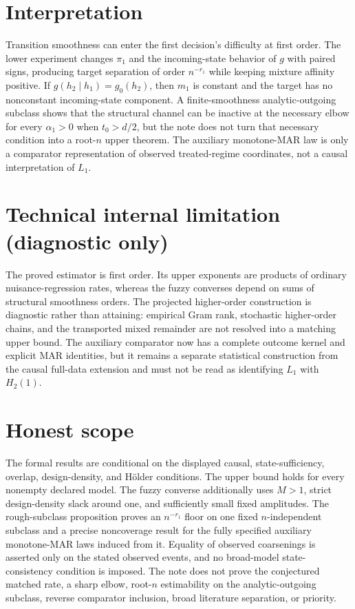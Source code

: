 \documentclass{article}
\begin{document}
\section{Interpretation}

Transition smoothness can enter the first decision's difficulty at first order. The lower experiment changes \(\pi_1\) and the incoming-state behavior of \(g\) with paired signs, producing target separation of order \(n^{-r_1}\) while keeping mixture affinity positive. If \(g(h_2\mid h_1)=g_0(h_2)\), then \(m_1\) is constant and the target has no nonconstant incoming-state component. A finite-smoothness analytic-outgoing subclass shows that the structural channel can be inactive at the necessary elbow for every \(\alpha_1>0\) when \(t_0>d/2\), but the note does not turn that necessary condition into a root-\(n\) upper theorem. The auxiliary monotone-MAR law is only a comparator representation of observed treated-regime coordinates, not a causal interpretation of \(L_1\).

\section*{Technical internal limitation (diagnostic only)}

The proved estimator is first order. Its upper exponents are products of ordinary nuisance-regression rates, whereas the fuzzy converses depend on sums of structural smoothness orders. The projected higher-order construction is diagnostic rather than attaining: empirical Gram rank, stochastic higher-order chains, and the transported mixed remainder are not resolved into a matching upper bound. The auxiliary comparator now has a complete outcome kernel and explicit MAR identities, but it remains a separate statistical construction from the causal full-data extension and must not be read as identifying \(L_1\) with \(H_2(1)\).

\section{Honest scope}

The formal results are conditional on the displayed causal, state-sufficiency, overlap, design-density, and H\"older conditions. The upper bound holds for every nonempty declared model. The fuzzy converse additionally uses \(M>1\), strict design-density slack around one, and sufficiently small fixed amplitudes. The rough-subclass proposition proves an \(n^{-r_1}\) floor on one fixed \(n\)-independent subclass and a precise noncoverage result for the fully specified auxiliary monotone-MAR laws induced from it. Equality of observed coarsenings is asserted only on the stated observed events, and no broad-model state-consistency condition is imposed. The note does not prove the conjectured matched rate, a sharp elbow, root-\(n\) estimability on the analytic-outgoing subclass, reverse comparator inclusion, broad literature separation, or priority.
\end{document}
